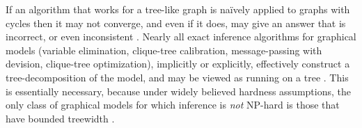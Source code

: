 \documentclass[twoside]{article}
\begin{document}
If an algorithm that works for a tree-like graph is na{\"i}vely
applied to graphs with cycles 
then it may not converge, and even if it does, 
may give an answer that is incorrect, or even inconsistent
\parencite{wainwright2008graphical}.  
Nearly all exact inference algorithms for graphical models (variable
elimination, clique-tree calibration, message-passing with devision,
clique-tree optimization),  
implicitly or explicitly, effectively construct a tree-decomposition of the model, and may be viewed as running on a tree \parencite[\S9-11]{koller2009probabilistic}.
This is essentially necessary, because under widely believed
hardness assumptions, the only class of graphical models for which
inference is \emph{not} NP-hard is those that have bounded treewidth
\parencite{chandrasekaran2012complexity}. 
\end{document}
